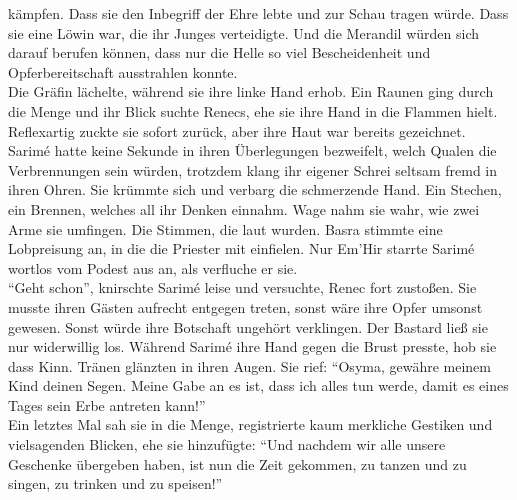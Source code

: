 kämpfen. Dass sie den Inbegriff der Ehre lebte und zur Schau tragen würde. Dass sie eine Löwin war, 
die ihr Junges verteidigte. Und die Merandil würden sich darauf berufen können, dass nur die Helle 
so viel Bescheidenheit und Opferbereitschaft ausstrahlen konnte.\\
Die Gräfin lächelte, während sie ihre linke Hand erhob. Ein Raunen ging durch die Menge und ihr 
Blick suchte Renecs, ehe sie ihre Hand in die Flammen hielt. Reflexartig zuckte sie sofort zurück, 
aber ihre Haut war bereits gezeichnet. Sarimé hatte keine Sekunde in ihren Überlegungen bezweifelt, 
welch Qualen die Verbrennungen sein würden, trotzdem klang ihr eigener Schrei seltsam fremd in 
ihren Ohren. Sie krümmte sich und verbarg die schmerzende Hand. Ein Stechen, ein Brennen, welches 
all ihr Denken einnahm. Wage nahm sie wahr, wie zwei Arme sie umfingen. Die Stimmen, die laut 
wurden. Basra stimmte eine Lobpreisung an, in die die Priester mit einfielen. Nur Em'Hir starrte 
Sarimé wortlos vom Podest aus an, als verfluche er sie.\\
``Geht schon'', knirschte Sarimé leise und versuchte, Renec fort zustoßen. Sie musste ihren Gästen 
aufrecht entgegen treten, sonst wäre ihre Opfer umsonst gewesen. Sonst würde ihre Botschaft 
ungehört verklingen. Der Bastard ließ sie nur widerwillig los. Während Sarimé ihre Hand gegen die 
Brust presste, hob sie dass Kinn. Tränen glänzten in ihren Augen. Sie rief: ``Osyma, gewähre meinem 
Kind deinen Segen. Meine Gabe an es ist, dass ich alles tun werde, damit es eines Tages sein Erbe 
antreten kann!''\\
Ein letztes Mal sah sie in die Menge, registrierte kaum merkliche Gestiken und vielsagenden 
Blicken, ehe sie hinzufügte: ``Und nachdem wir alle unsere Geschenke übergeben haben, ist nun die 
Zeit gekommen, zu tanzen und zu singen, zu trinken und zu speisen!''\\

